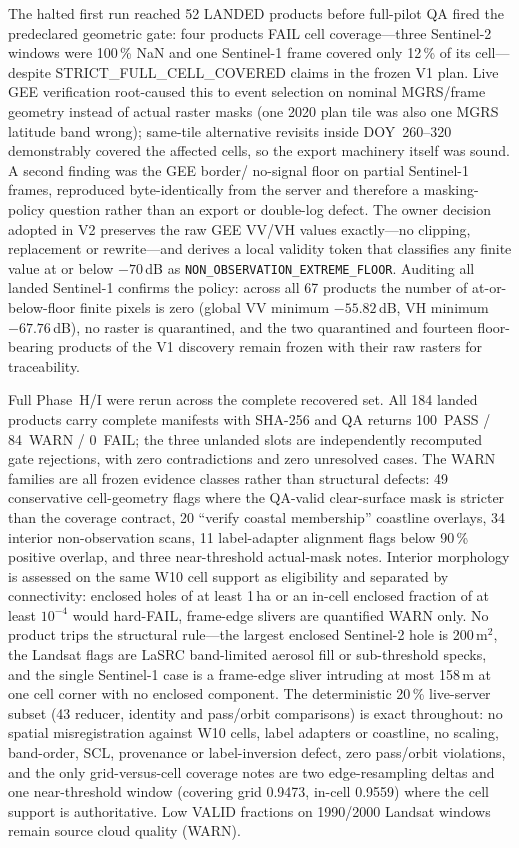 The halted first run reached 52 LANDED products before full-pilot QA
fired the predeclared geometric gate: four products FAIL cell
coverage---three Sentinel-2 windows were 100\,\% NaN and one
Sentinel-1 frame covered only 12\,\% of its cell---despite
STRICT\_FULL\_CELL\_COVERED claims in the frozen V1 plan. Live GEE
verification root-caused this to event selection on nominal MGRS/frame
geometry instead of actual raster masks (one 2020 plan tile was also
one MGRS latitude band wrong); same-tile alternative revisits inside
DOY~260--320 demonstrably covered the affected cells, so the export
machinery itself was sound. A second finding was the GEE border/
no-signal floor on partial Sentinel-1 frames, reproduced
byte-identically from the server and therefore a masking-policy
question rather than an export or double-log defect. The owner
decision adopted in V2 preserves the raw GEE VV/VH values exactly---no
clipping, replacement or rewrite---and derives a local validity token
that classifies any finite value at or below $-70$\,dB as
\texttt{NON\_OBSERVATION\_EXTREME\_FLOOR}. Auditing all landed
Sentinel-1 confirms the policy: across all 67 products the number of
at-or-below-floor finite pixels is zero (global VV minimum
$-55.82$\,dB, VH minimum $-67.76$\,dB), no raster is quarantined, and
the two quarantined and fourteen floor-bearing products of the V1
discovery remain frozen with their raw rasters for traceability.

Full Phase~H/I were rerun across the complete recovered set. All 184
landed products carry complete manifests with SHA-256 and QA returns
100~PASS / 84~WARN / 0~FAIL; the three unlanded slots are
independently recomputed gate rejections, with zero contradictions and
zero unresolved cases. The WARN families are all frozen evidence
classes rather than structural defects: 49 conservative cell-geometry
flags where the QA-valid clear-surface mask is stricter than the
coverage contract, 20 ``verify coastal membership'' coastline
overlays, 34 interior non-observation scans, 11 label-adapter
alignment flags below 90\,\% positive overlap, and three near-threshold
actual-mask notes. Interior morphology is assessed on the same W10
cell support as eligibility and separated by connectivity: enclosed
holes of at least 1\,ha or an in-cell enclosed fraction of at least
$10^{-4}$ would hard-FAIL, frame-edge slivers are quantified WARN
only. No product trips the structural rule---the largest enclosed
Sentinel-2 hole is 200\,m$^2$, the Landsat flags are LaSRC
band-limited aerosol fill or sub-threshold specks, and the single
Sentinel-1 case is a frame-edge sliver intruding at most 158\,m at one
cell corner with no enclosed component. The deterministic 20\,\%
live-server subset (43 reducer, identity and pass/orbit comparisons) is
exact throughout: no spatial misregistration against W10 cells, label
adapters or coastline, no scaling, band-order, SCL, provenance or
label-inversion defect, zero pass/orbit violations, and the only
grid-versus-cell coverage notes are two edge-resampling deltas and one
near-threshold window (covering grid 0.9473, in-cell 0.9559) where the
cell support is authoritative. Low VALID fractions on 1990/2000
Landsat windows remain source cloud quality (WARN).

